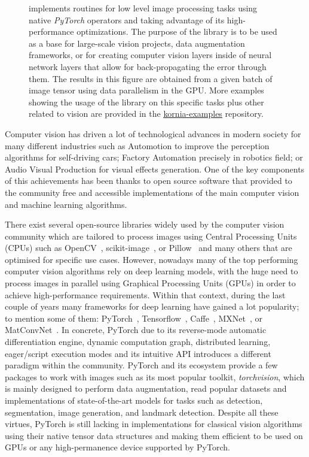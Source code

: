 \begin{figure}[h!]
\begin{center}
\begin{tabular}{c c c c c}
        \end{tabular}
    \end{center}
    \caption{\lib{} implements routines for low level image processing tasks using native \textit{PyTorch} operators and taking advantage of its high-performance optimizations. The purpose of the library is to be used as a base for large-scale vision projects, data augmentation frameworks, or for creating computer vision layers inside of neural network layers that allow for back-propagating the error through them. The results in this figure are obtained from a given batch of image tensor using data parallelism in the GPU. More examples showing the usage of the library on this specific tasks plus other related to vision are provided in the \underline{\color{blue}\href{https://github.com/kornia/kornia-examples}{kornia-examples}} repository.}
    \label{fig:imgproc}
\end{figure}

Computer vision has driven a lot of technological advances in modern society for many different industries such as Automotion to improve the perception algorithms for self-driving cars; Factory Automation precisely in robotics field; or Audio Visual Production for visual effects generation. One of the key components of this achievements has been thanks to open source software that provided to the community free and accessible implementations of the main computer vision and machine learning algorithms.

There exist several open-source libraries widely used by the computer vision community which are tailored to process images using Central Processing Units (CPUs) such as OpenCV~\citep{opencv}, scikit-image~\citep{scikit-image}, or Pillow~\citep{pillow} and many others that are optimised for specific use cases. However, nowadays many of the top performing computer vision algorithms rely on deep learning models, with the huge need to process images in parallel using Graphical Processing Units (GPUs) in order to achieve high-performance requirements. Within that context, during the last couple of years many frameworks for deep learning have gained a lot popularity; to mention some of them: PyTorch~\citep{pytorch}, Tensorflow~\citep{tensorflow2015-whitepaper}, Caffe~\citep{caffe}, MXNet~\citep{journals/corr/ChenLLLWWXXZZ15}, or MatConvNet~\citep{Vedaldi15}. In concrete, PyTorch \citep{pytorch} due to its reverse-mode automatic differentiation engine, dynamic computation graph, distributed learning, eager/script execution modes and its intuitive API introduces a different paradigm within the community. PyTorch and its ecosystem provide a few packages to work with images such as its most popular toolkit, \textit{torchvision}, which is mainly designed to perform data augmentation, read popular datasets and implementations of state-of-the-art models for tasks such as detection, segmentation, image generation, and landmark detection. Despite all these virtues, PyTorch is still lacking in implementations for classical vision algorithms using their native tensor data structures and making them efficient to be used on GPUs or any high-permanence device supported by PyTorch.

